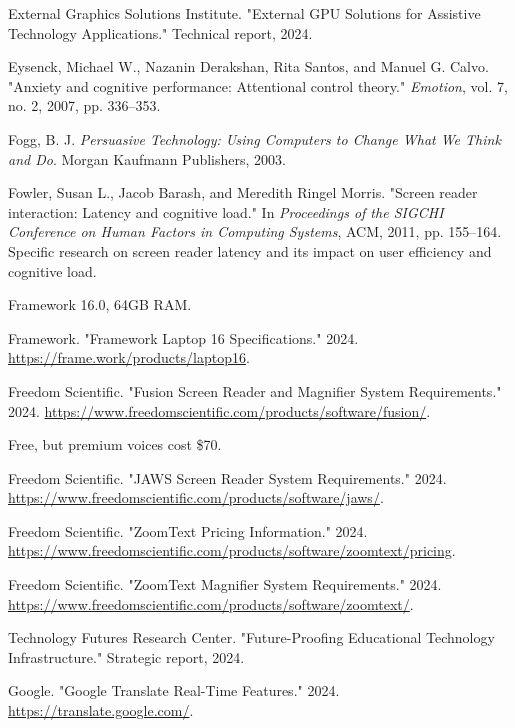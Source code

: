 \begin{thebibliography}{99}
External Graphics Solutions Institute. "External GPU Solutions for Assistive Technology Applications." Technical report, 2024.

Eysenck, Michael W., Nazanin Derakshan, Rita Santos, and Manuel G. Calvo. "Anxiety and cognitive performance: Attentional control theory." \emph{Emotion}, vol. 7, no. 2, 2007, pp. 336--353.

Fogg, B. J. \emph{Persuasive Technology: Using Computers to Change What We Think and Do}. Morgan Kaufmann Publishers, 2003.

Fowler, Susan L., Jacob Barash, and Meredith Ringel Morris. "Screen reader interaction: Latency and cognitive load." In \emph{Proceedings of the SIGCHI Conference on Human Factors in Computing Systems}, ACM, 2011, pp. 155--164. Specific research on screen reader latency and its impact on user efficiency and cognitive load.

Framework 16.0, 64GB RAM.

Framework. "Framework Laptop 16 Specifications." 2024. \url{https://frame.work/products/laptop16}.

Freedom Scientific. "Fusion Screen Reader and Magnifier System Requirements." 2024. \url{https://www.freedomscientific.com/products/software/fusion/}.

Free, but premium voices cost \$70.

Freedom Scientific. "JAWS Screen Reader System Requirements." 2024. \url{https://www.freedomscientific.com/products/software/jaws/}.

Freedom Scientific. "ZoomText Pricing Information." 2024. \url{https://www.freedomscientific.com/products/software/zoomtext/pricing}.

Freedom Scientific. "ZoomText Magnifier System Requirements." 2024. \url{https://www.freedomscientific.com/products/software/zoomtext/}.

Technology Futures Research Center. "Future-Proofing Educational Technology Infrastructure." Strategic report, 2024.

Google. "Google Translate Real-Time Features." 2024. \url{https://translate.google.com/}.


\end{thebibliography}

